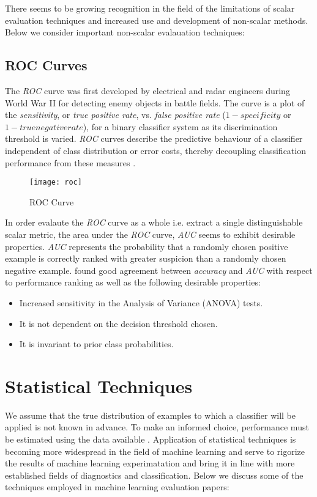 \documentclass[10pt]{unbthesis}
\begin{document}
There seems to be growing recognition in the field of the limitations
of scalar evaluation techniques and increased use and development of
non-scalar methods. Below we consider important non-scalar evalauation
techniques:

\subsection*{ROC Curves}
The \textit{ROC} curve was first developed by electrical and radar
engineers during World War II for detecting enemy objects in battle
fields. The curve is a plot of the \textit{sensitivity}, or
\textit{true positive rate}, vs. \textit{false positive rate} (\(1 −
specificity\) or \(1 - true negative rate\)), for a binary classifier
system as its discrimination threshold is varied. \textit{ROC}
curves describe the predictive behaviour of a classifier independent
of class distribution or error costs, thereby decoupling
classification performance from these measures \cite{Refworks:45}.

\begin{figure}
  \begin{center}
	\texttt{[image: roc]}
  \end{center}
  \caption{ROC Curve}
  \label{fig:roc}
\end{figure} 


In order evalaute the \textit{ROC} curve as a whole i.e. extract a
single distinguishable scalar metric, the area under the \textit{ROC}
curve, \textit{AUC} seems to exhibit desirable
properties. \textit{AUC} represents the probability that a randomly
chosen positive example is correctly ranked with greater suspicion
than a randomly chosen negative example. \cite{Refworks:32} found good
agreement between \textit{accuracy} and \textit{AUC} with respect to
performance ranking as well as the following desirable properties:

\begin{itemize}
\item Increased sensitivity in the Analysis of Variance (ANOVA) tests.
\item It is not dependent on the decision threshold chosen.
\item It is invariant to prior class probabilities.
\end{itemize}

\section*{Statistical Techniques}
We assume that the true distribution of examples to which a classifier
will be applied is not known in advance. To make an informed choice,
performance must be estimated using the data available
\cite{RefWorks:45}. Application of statistical techniques is
becoming more widespread in the field of machine learning and serve to
rigorize the results of machine learning experimatation and bring it
in line with more established fields of diagnostics and
classification. Below we discuss some of the techniques employed in
machine learning evaluation papers:
\end{document}
